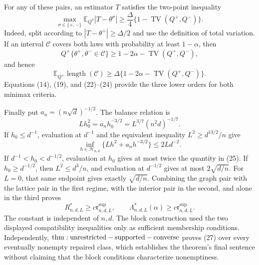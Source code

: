 For any of these pairs, an estimator \(T\) satisfies the two-point inequality
\[
 \max_{\sigma\in\{+,-\}}\mathbb E_{Q^\sigma}|T-\theta^\sigma|
 \geq\frac\Delta4\{1-\operatorname{TV}(Q^+,Q^-)\}.
\tag{23}
\]
Indeed, split according to \(|T-\theta^+|\geq\Delta/2\) and use the definition of total variation.  If an interval \(\mathcal C\) covers both laws with probability at least \(1-\alpha\), then
\[
 Q^+\{\theta^+,\theta^-\in\mathcal C\}
 \geq1-2\alpha-\operatorname{TV}(Q^+,Q^-),
\]
and hence
\[
 \mathbb E_{Q^+}\operatorname{length}(\mathcal C)
 \geq\Delta\{1-2\alpha-\operatorname{TV}(Q^+,Q^-)\}.
\tag{24}
\]
Equations (14), (19), and (22)--(24) provide the three lower orders for both minimax criteria.

Finally put \(a_n=(n\sqrt d)^{-1/2}\).  The balance relation is
\[
 Lh_0^2=a_nh_0^{-3/2}=L^{3/7}(n^2d)^{-1/7}.
\tag{25}
\]
If \(h_0\leq d^{-1}\), evaluation at \(d^{-1}\) and the equivalent inequality \(L^2\geq d^{13/2}/n\) give
\[
 \inf_{h\in\mathcal H_{n,d}}\{Lh^2+a_nh^{-3/2}\}\leq2Ld^{-2}.
\tag{26}
\]
If \(d^{-1}<h_0<d^{-1/2}\), evaluation at \(h_0\) gives at most twice the quantity in (25).  If \(h_0\geq d^{-1/2}\), then \(L^2\leq d^3/n\), and evaluation at \(d^{-1/2}\) gives at most \(2\sqrt{d/n}\).  For \(L=0\), that same endpoint gives exactly \(\sqrt{d/n}\).  Combining the graph pair with the lattice pair in the first regime, with the interior pair in the second, and alone in the third proves
\[
 R^*_{n,d,L}\geq c\mathfrak r^{\mathrm{sup}}_{n,d,L},
 \qquad \Lambda^*_{n,d,L}(\alpha)\geq c\mathfrak r^{\mathrm{sup}}_{n,d,L}.
\tag{27}
\]
The constant is independent of \(n,d\).  The block construction used the two displayed compatibility inequalities only as sufficient membership conditions.  Independently, \({\rm thm:unrestricted-supported-converse}\) proves (27) over every eventually nonempty repaired class, which establishes the theorem's final sentence without claiming that the block conditions characterize nonemptiness.
